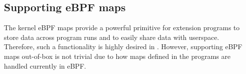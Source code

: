\subsection{Supporting eBPF maps}
\label{impl:map}
%
%
The kernel eBPF maps provide a powerful primitive for extension programs to
    store data across program runs and to easily share data with userspace.
Therefore, such a functionality is highly desired in \projname{}.
However, supporting eBPF maps out-of-box is not trivial due to how maps defined
    in the programs are handled currently in eBPF.

